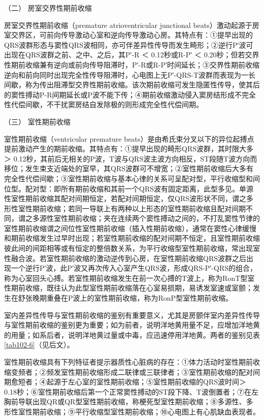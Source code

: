 \hypertarget{text00288.htmlux5cux23CHP10-2-1-2-2-2}{}
（二） 房室交界性期前收缩

房室交界性期前收缩（premature atrioventricular junctional
beats）激动起源于房室交界区，可前向传导激动心室和逆向传导激动心房。其特点有：①提早出现的QRS波群形态与窦性QRS波相同，亦可伴差异性传导而发生畸形；②逆行P′波可出现在QRS波群之前、之中、之后，其P′-R
＜ 0.12秒或R-P′ ＜
0.20秒；但若交界性期前收缩兼有逆向或前向传导阻滞时，P′-R或R-P′时间延长；③交界性期前收缩逆向和前向同时出现完全性传导阻滞时，心电图上无P′-QRS-T波群而表现为一长间歇，称为传出阻滞型交界性期前收缩。该次期前收缩可发生隐匿性传导，使其后的窦性搏动P-R间期延长或P波不能下传；④期前收缩激动侵入窦房结形成不完全性代偿间歇，不干扰窦房结自发除极的则形成完全性代偿间期。

\hypertarget{text00288.htmlux5cux23CHP10-2-1-2-2-3}{}
（三） 室性期前收缩

室性期前收缩（ventricular premature
beats）是由希氏束分叉以下的异位起搏点提前激动产生的期前收缩。其特点有：①提早出现的畸形QRS波群，其时限大多＞
0.12秒，其前后无相关的P波，T波与QRS波主波方向相反，ST段随T波方向而移位；发生束支近端处的室早，其QRS波群可不增宽；②室性期前收缩后大多有完全性代偿间歇；③室性期前收缩与基本心律的关系可呈配对型，平行收缩型和间位型。配对型：即所有期前收缩和其前一个QRS波有固定距离，此型多见。单源性室性期前收缩其配对间期恒定，若配对间期恒定，仅QRS波形状不同，谓之多形性室性期前收缩；若同一导联上有两种以上形态的室性期前收缩且配对间期不同，谓之多源性室性期前收缩；夹在连续两个窦性搏动之间的，不打乱窦性节律的室性期前收缩谓之间位性室性期前收缩（插入性期前收缩），通常在窦性心律缓慢和期前收缩发生过早时出现；若室性期前收缩的配对间期不恒定，且室性期前收缩彼此间的间距相等或有恒定的整倍数关系，为平行收缩型室性期前收缩，常出现室性融合波。若室性期前收缩的激动逆传到心房，在室性期前收缩QRS波群之后出现一个逆行P′波，此P′波又再次传入心室产生QRS波，形成QRS-P′-QRS的组合，称为心室回头心搏。若室性期前收缩发生在前一次心搏的T波上，称为RonT型室性期前收缩，既往认为此型室性期前收缩落在心室易损期，易诱发室速或室颤；发生在舒张晚期重叠在P波上的室性期前收缩，称为RonP型室性期前收缩。

室内差异性传导与室性期前收缩的鉴别有重要意义，尤其是房颤伴室内差异性传导与室性期前收缩的鉴别更为重要；如为前者，说明洋地黄用量不足，应增加洋地黄的用量；如系后者，说明洋地黄过量或中毒，应迅速停用洋地黄。两者的鉴别见表\ref{tab102-6}（见后文）。

室性期前收缩具有下列特征者提示器质性心脏病的存在：①体力活动时室性期前收缩变频者；②频发室性期前收缩形成二联律或三联律者；③室性期前收缩的配对间期愈短者；④起源于左心室的室性期前收缩；⑤室性期前收缩的QRS波时间＞
0.18秒；⑥室性期前收缩后第一个正常窦性搏动的ST段下降、T波倒置者；⑦在左胸前导联出现QR或QR型室性期前收缩，称梗死型室性期前收缩；⑧多源性、多形性室性期前收缩；⑨平行收缩型室性期前收缩；⑩心电图上有心肌缺血表现者。

